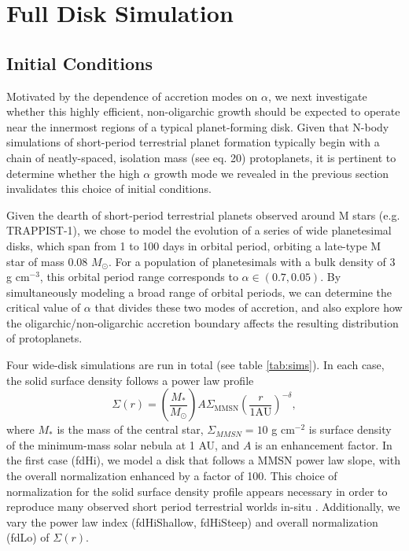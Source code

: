 \documentclass[twocolumn]{aastex63}
\begin{document}
\section{Full Disk Simulation}\label{sec:fulldisk}

\subsection{Initial Conditions}

Motivated by the dependence of accretion modes on $\alpha$,
we next investigate whether this highly efficient, non-oligarchic
growth should be expected to operate near the innermost regions of a typical planet-forming
disk. Given that N-body simulations of short-period terrestrial planet formation 
typically begin with a chain of neatly-spaced, isolation mass 
(see \citet{kokubo00} eq. 20) protoplanets, it is pertinent to determine 
whether the high $\alpha$ growth mode we revealed
in the previous section invalidates this choice of initial conditions.

Given the dearth of short-period terrestrial planets observed around M stars (e.g. TRAPPIST-1), we chose to model the evolution of a series of wide planetesimal disks, which span from 1 to 100 days in orbital period, orbiting a late-type M star of mass 0.08 $M_{\odot}$. For a population of planetesimals with a bulk density of 3 g cm$^{-3}$, this orbital period range corresponds to $\alpha \in (0.7, 0.05)$. By simultaneously modeling a broad range of orbital periods, we can determine the critical value of $\alpha$ that divides these two modes of accretion, and also explore how the oligarchic/non-oligarchic accretion boundary affects the resulting distribution of protoplanets.

Four wide-disk simulations are run in total (see table \ref{tab:sims}). In each case, the solid surface density follows a power law profile
\begin{equation}
	\Sigma(r) = \left( \frac{M_{*}}{M_{\odot}} \right) A \Sigma_{\mathrm{MMSN}} \left( \frac{r}{1 \mathrm{AU}} \right)^{-\delta},
\end{equation}
where $M_{*}$ is the mass of the central star, $\Sigma_{MMSN} = 10$ g cm$^{-2}$ is surface density of the minimum-mass solar nebula \citep{hayashi81} at 1 AU, and $A$ is an enhancement factor. In the first case (fdHi), we model a disk that follows a MMSN power law slope, with the overall normalization enhanced by a factor of 100. This choice of normalization for the solid surface density profile appears necessary in order to reproduce many observed short period terrestrial worlds in-situ \citep{hansen12}. Additionally, we vary the power law index (fdHiShallow, fdHiSteep) and overall normalization (fdLo) of $\Sigma(r)$.
\end{document}
